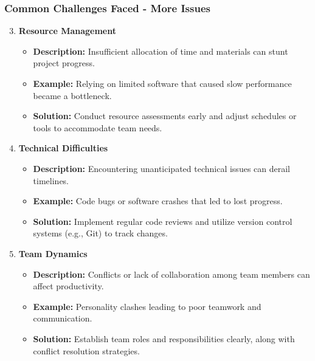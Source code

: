 \documentclass[aspectratio=169]{beamer}
\begin{document}
\begin{frame}[fragile]
    \frametitle{Common Challenges Faced - More Issues}
    \begin{enumerate}
        \setcounter{enumi}{2}
        \item \textbf{Resource Management}
            \begin{itemize}
                \item \textbf{Description:} Insufficient allocation of time and materials can stunt project progress.
                \item \textbf{Example:} Relying on limited software that caused slow performance became a bottleneck.
                \item \textbf{Solution:} Conduct resource assessments early and adjust schedules or tools to accommodate team needs.
            \end{itemize}
        \item \textbf{Technical Difficulties}
            \begin{itemize}
                \item \textbf{Description:} Encountering unanticipated technical issues can derail timelines.
                \item \textbf{Example:} Code bugs or software crashes that led to lost progress.
                \item \textbf{Solution:} Implement regular code reviews and utilize version control systems (e.g., Git) to track changes.
            \end{itemize}
        \item \textbf{Team Dynamics}
            \begin{itemize}
                \item \textbf{Description:} Conflicts or lack of collaboration among team members can affect productivity.
                \item \textbf{Example:} Personality clashes leading to poor teamwork and communication.
                \item \textbf{Solution:} Establish team roles and responsibilities clearly, along with conflict resolution strategies.
            \end{itemize}
    \end{enumerate}
\end{frame}
\end{document}
